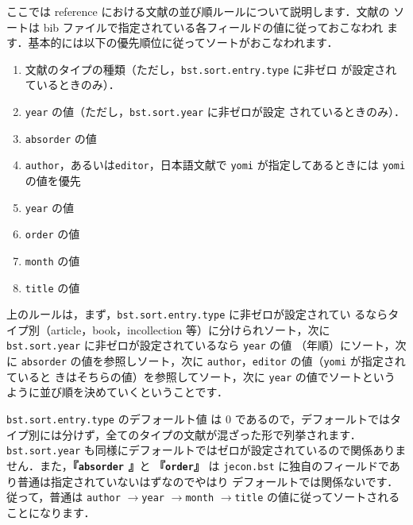 \documentclass[a4j,10pt]{jarticle}
\begin{document}
ここでは reference における文献の並び順ルールについて説明します．文献の
ソートは bib ファイルで指定されている各フィールドの値に従っておこなわれ
ます．基本的には以下の優先順位に従ってソートがおこなわれます．
\begin{enumerate}
 \item 文献のタイプの種類（ただし，\texttt{bst.sort.entry.type} に非ゼロ
       が設定されているときのみ）．
 \item \texttt{year} の値（ただし，\texttt{bst.sort.year} に非ゼロが設定
       されているときのみ）．
 \item \texttt{absorder} の値
 \item \texttt{author}，あるいは\texttt{editor}，日本語文献で
       \texttt{yomi} が指定してあるときには \texttt{yomi} の値を優先
 \item \texttt{year} の値
 \item \texttt{order} の値
 \item \texttt{month} の値
 \item \texttt{title} の値
\end{enumerate}

上のルールは，まず，\texttt{bst.sort.entry.type} に非ゼロが設定されてい
るならタイプ別（article，book，incollection 等）に分けられソート，次に 
\texttt{bst.sort.year} に非ゼロが設定されているなら \texttt{year} の値 
（年順）にソート，次に \texttt{absorder} の値を参照しソート，次に 
\texttt{author}，\texttt{editor} の値（\texttt{yomi} が指定されていると
きはそちらの値）を参照してソート，次に \texttt{year} の値でソートという
ように並び順を決めていくということです．

\texttt{bst.sort.entry.type} のデフォールト値 は 0 であるので，デフォールトではタ
イプ別には分けず，全てのタイプの文献が混ざった形で列挙されます．
\texttt{bst.sort.year} も同様にデフォールトではゼロが設定されているので関係ありま
せん．また，\textbf{『\texttt{absorder} 』}と \textbf {『\texttt{order}』} は
\texttt{jecon.bst} に独自のフィールドであり普通は指定されていないはずなのでやはり
デフォールトでは関係ないです．従って，普通は \texttt{author}
$\rightarrow$\texttt{year} $\rightarrow$\texttt{month}
$\rightarrow$\texttt{title} の値に従ってソートされることになります．
\end{document}
